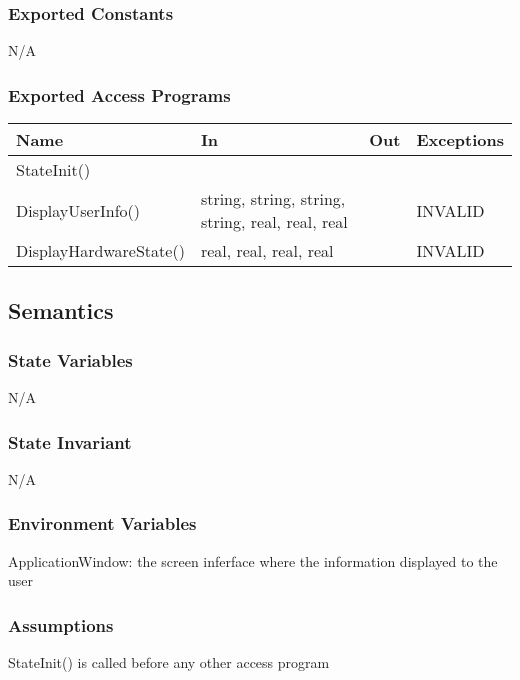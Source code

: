 \documentclass[12pt, titlepage]{article}
\begin{document}
\subsubsection{Exported Constants}

N/A
\subsubsection{Exported Access Programs}

\begin{center}
\begin{tabular}{p{5cm} p{5cm} p{1cm} p{3cm}}
\hline
\textbf{Name} & \textbf{In} & \textbf{Out} & \textbf{Exceptions} \\
\hline
StateInit() & &  &  \\
DisplayUserInfo() & string, string, string, string, real, real, real &  & INVALID \\
DisplayHardwareState() & real, real, real, real&  & INVALID \\
\hline
\end{tabular}
\end{center}

\subsection{Semantics}

\subsubsection{State Variables}

N/A

\subsubsection{State Invariant}

N/A

\subsubsection{Environment Variables}

ApplicationWindow: the screen inferface where the information displayed to the user

\subsubsection{Assumptions}

StateInit() is called before any other access program
\end{document}
